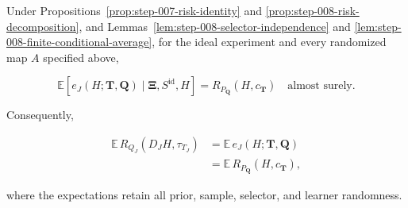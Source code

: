 \begin{proposition}\label{prop:step-008-selected-risk-identity}
Under Propositions~\ref{prop:step-007-risk-identity} and
\ref{prop:step-008-risk-decomposition}, and
Lemmas~\ref{lem:step-008-selector-independence} and
\ref{lem:step-008-finite-conditional-average}, for the ideal experiment
and every randomized map \(A\) specified above,

\[
\mathbb E\!\left[
e_J(H;\boldsymbol T,\boldsymbol Q)
\mid\boldsymbol\Xi,S^{\mathrm{id}},H
\right]
=R_{P_{\boldsymbol Q}}(H,c_{\boldsymbol T})
\quad\text{almost surely}.
\tag{S8.14}\label{eq:step-008-14}
\]

Consequently,

\[
\begin{aligned}
\mathbb E\,
R_{Q_J}(D_JH,\tau_{T_J})
&=\mathbb E\,e_J(H;\boldsymbol T,\boldsymbol Q)\\
&=\mathbb E\,R_{P_{\boldsymbol Q}}(H,c_{\boldsymbol T}),
\end{aligned}
\tag{S8.15}\label{eq:step-008-15}
\]

where the expectations retain all prior, sample, selector, and learner
randomness.
\end{proposition}

